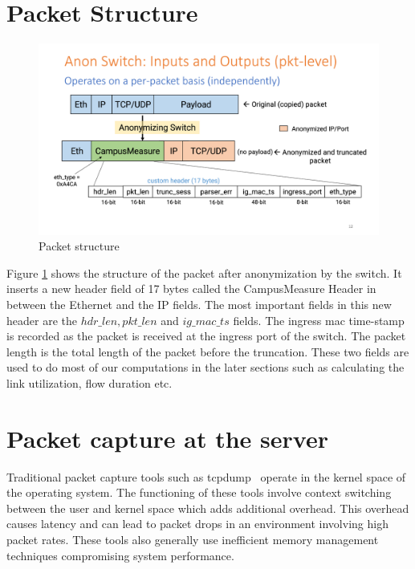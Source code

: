 \section{Packet Structure}

\begin{figure}[t]
    \centering
        \includegraphics[width=\textwidth]{Figures/pkt-struct.png}
    \caption[Packet structure]{Packet structure}
    \label{fig:struct}
    \bigskip
\end{figure}

Figure \ref{fig:struct} shows the structure of the packet after anonymization by the switch. It inserts a new header field of 17 bytes called the CampusMeasure Header in between the Ethernet and the IP fields.
The most important fields in this new header are the $hdr\_len,pkt\_len$ and $ig\_mac\_ts$ fields. The ingress mac time-stamp is recorded as the packet is received at the ingress port of the switch. The packet length is the total length of the packet before the truncation. These two fields are used to do most of our computations in the later sections such as calculating the link utilization, flow duration etc.

\section{Packet capture at the server}

Traditional packet capture tools such as tcpdump~\cite{tcpdump} operate in the kernel space of the operating system. The functioning of these tools involve context switching between the user and kernel space which adds additional overhead. This overhead causes latency and can lead to packet drops in an environment involving high packet rates. These tools also generally use inefficient memory management techniques compromising system performance.

